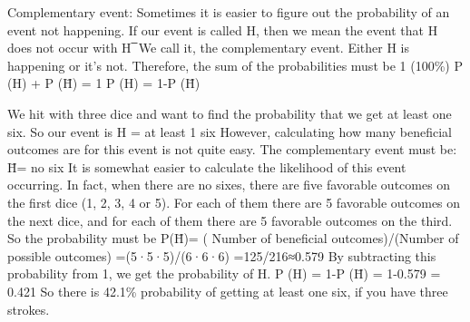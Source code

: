 Complementary event:
Sometimes it is easier to figure out the probability of an event not happening.
If our event is called H, then we mean the event that H does not occur with
H ̅
We call it, the complementary event. Either H is happening or it’s not. Therefore, the sum of the probabilities must be 1 (100\%)
P (H) + P (\={H}) = 1
P (H) = 1-P (\={H})

We hit with three dice and want to find the probability that we get at least one six. So our event is
H = {at least 1 six}
However, calculating how many beneficial outcomes are for this event is not quite easy.
The complementary event must be:
\={H}= {no six}
It is somewhat easier to calculate the likelihood of this event occurring. In fact, when there are no sixes, there are five favorable outcomes on the first dice (1, 2, 3, 4 or 5). For each of them there are 5 favorable outcomes on the next dice, and for each of them there are 5 favorable outcomes on the third. So the probability must be
P(\={H})=  ( Number of beneficial outcomes)/(Number of possible outcomes)  =(5·5·5)/(6·6·6)  =125/216≈0.579
By subtracting this probability from 1, we get the probability of H.
P (H) = 1-P (\={H}) = 1-0.579 = 0.421
So there is 42.1\% probability of getting at least one six, if you have three strokes.
